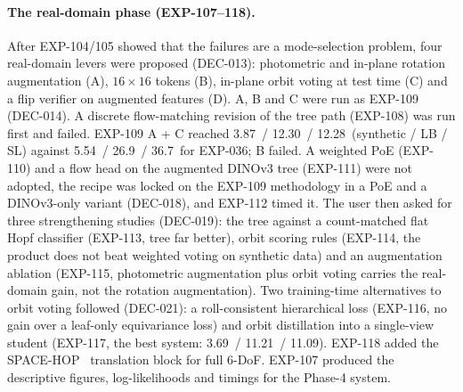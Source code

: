 \paragraph{The real-domain phase (EXP-107--118).}
After EXP-104/105 showed that the failures are a mode-selection problem, four real-domain levers were proposed (DEC-013): photometric and in-plane rotation augmentation (A), $16\times16$ tokens (B), in-plane orbit voting at test time (C) and a flip verifier on augmented features (D). A, B and C were run as EXP-109 (DEC-014). A discrete flow-matching revision of the tree path (EXP-108) was run first and failed. EXP-109 A + C reached 3.87\appDdeg\ / 12.30\appDdeg\ / 12.28\appDdeg\ (synthetic / LB / SL) against 5.54\appDdeg\ / 26.9\appDdeg\ / 36.7\appDdeg\ for EXP-036; B failed. A weighted PoE (EXP-110) and a flow head on the augmented DINOv3 tree (EXP-111) were not adopted, the recipe was locked on the EXP-109 methodology in a PoE and a DINOv3-only variant (DEC-018), and EXP-112 timed it. The user then asked for three strengthening studies (DEC-019): the tree against a count-matched flat Hopf classifier (EXP-113, tree far better), orbit scoring rules (EXP-114, the product does not beat weighted voting on synthetic data) and an augmentation ablation (EXP-115, photometric augmentation plus orbit voting carries the real-domain gain, not the rotation augmentation). Two training-time alternatives to orbit voting followed (DEC-021): a roll-consistent hierarchical loss (EXP-116, no gain over a leaf-only equivariance loss) and orbit distillation into a single-view student (EXP-117, the best system: 3.69\appDdeg\ / 11.21\appDdeg\ / 11.09\appDdeg). EXP-118 added the SPACE-HOP~\cite{dutta2026spacehop} translation block for full 6-DoF. EXP-107 produced the descriptive figures, log-likelihoods and timings for the Phase-4 system.

